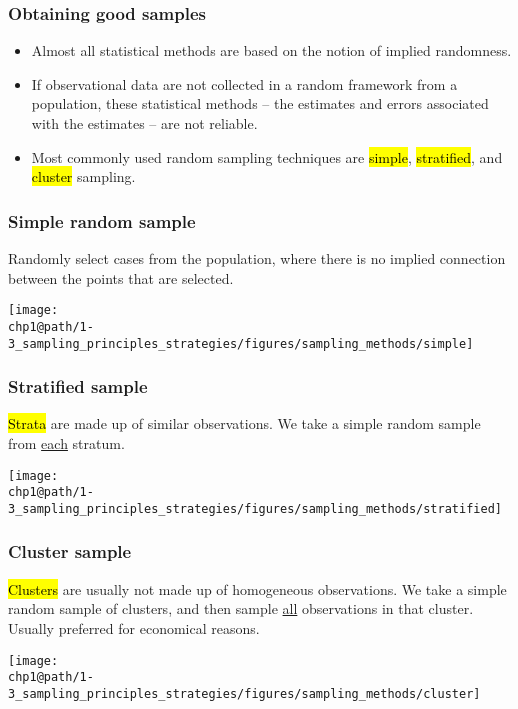\documentclass[slidestop,compress,mathserif]{beamer}
\makeatletter
\def\chp1@path{../../Chp 1}
\makeatother
\begin{document}

\begin{frame}
	\frametitle{Obtaining good samples}

	\begin{itemize}
		\item Almost all statistical methods are based on the notion of implied randomness. 
		\item If observational data are not collected in a random framework from a population, these statistical methods -- the estimates and errors associated with the estimates -- are not reliable.
		\item Most commonly used random sampling techniques are \hl{simple}, \hl{stratified}, and \hl{cluster} sampling.
	\end{itemize}

\end{frame}


\begin{frame}
	\frametitle{Simple random sample}

	Randomly select cases from the population, where there is no implied connection between the points that are selected.

	\begin{center}
	\texttt{[image: \\chp1@path/1-3\_sampling\_principles\_strategies/figures/sampling\_methods/simple]}
	\end{center}

\end{frame}


\begin{frame}
	\frametitle{Stratified sample}

	\hl{Strata} are made up of similar observations. We take a simple random sample from \underline{each} stratum.

	\begin{center}
	\texttt{[image: \\chp1@path/1-3\_sampling\_principles\_strategies/figures/sampling\_methods/stratified]}
	\end{center}

\end{frame}


\begin{frame}
	\frametitle{Cluster sample}

	\hl{Clusters} are usually not made up of homogeneous observations. We take a simple random sample of clusters, and then sample \underline{all} observations in that cluster. Usually preferred for economical reasons.

	\begin{center}
	\texttt{[image: \\chp1@path/1-3\_sampling\_principles\_strategies/figures/sampling\_methods/cluster]}
	\end{center}

\end{frame}
\end{document}
